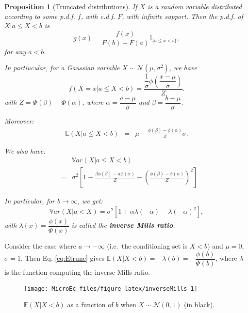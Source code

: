 \documentclass[
  12pt,
]{book}
\newtheorem{proposition}{Proposition}[chapter]
\theoremstyle{definition}
\theoremstyle{definition}
\theoremstyle{definition}
\theoremstyle{definition}
\theoremstyle{remark}
\begin{document}
\begin{proposition}[Truncated distributions]
\protect\hypertarget{prp:truncated}{}\label{prp:truncated}If \(X\) is a random variable distributed according to some p.d.f. \(f\), with c.d.f. \(F\), with infinite support. Then the p.d.f. of \(X|a \le X < b\) is
\[
g(x) = \frac{f(x)}{F(b)-F(a)}\mathbb{I}_{\{a \le x < b\}},
\]
for any \(a<b\).

In partiucular, for a Gaussian variable \(X \sim \mathcal{N}(\mu,\sigma^2)\), we have
\[
f(X=x|a\le X<b) = \dfrac{\dfrac{1}{\sigma}\phi\left(\dfrac{x - \mu}{\sigma}\right)}{Z}.
\]
with \(Z = \Phi(\beta)-\Phi(\alpha)\), where \(\alpha = \dfrac{a - \mu}{\sigma}\) and \(\beta = \dfrac{b - \mu}{\sigma}\).

Moreover:
\begin{eqnarray}
\mathbb{E}(X|a\le X<b) &=& \mu - \frac{\phi\left(\beta\right)-\phi\left(\alpha\right)}{Z}\sigma. \label{eq:Etrunc}
\end{eqnarray}

We also have:
\begin{eqnarray}
&& \mathbb{V}ar(X|a\le X<b) \nonumber\\
&=& \sigma^2\left[
1 -  \frac{\beta\phi\left(\beta\right)-\alpha\phi\left(\alpha\right)}{Z} -  \left(\frac{\phi\left(\beta\right)-\phi\left(\alpha\right)}{Z}\right)^2 \right] \label{eq:Vtrunc}
\end{eqnarray}

In particular, for \(b \rightarrow \infty\), we get:
\begin{equation}
\mathbb{V}ar(X|a < X) = \sigma^2\left[1 + \alpha\lambda(-\alpha) - \lambda(-\alpha)^2 \right], \label{eq:Vtrunc2}
\end{equation}
with \(\lambda(x)=\dfrac{\phi(x)}{\Phi(x)}\) is called the \textbf{inverse Mills ratio}.
\end{proposition}

Consider the case where \(a \rightarrow - \infty\) (i.e.~the conditioning set is \(X<b\)) and \(\mu=0\), \(\sigma=1\). Then Eq. \eqref{eq:Etrunc} gives \(\mathbb{E}(X|X<b) = - \lambda(b) = - \dfrac{\phi(b)}{\Phi(b)}\), where \(\lambda\) is the function computing the inverse Mills ratio.

\begin{figure}
\texttt{[image: MicroEc\_files/figure-latex/inverseMills-1]} \caption{$\mathbb{E}(X|X<b)$ as a function of $b$ when $X\sim \mathcal{N}(0,1)$ (in black).}\label{fig:inverseMills}
\end{figure}
\end{document}
